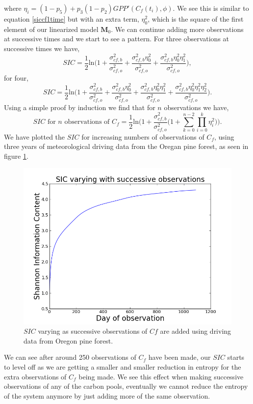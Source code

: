 \documentclass[11pt]{article}
\begin{document}
where $\eta_i=(1-p_5)+p_3(1-p_2)GPP'(C_f(t_i),\phi)$. We see this is similar to equation \ref{siccf1time} but with an extra term, $\eta_0^2$, which is the square of the first element of our linearized model $\mathbf{M}_0$. We can continue adding more observations at successive times and we start to see a pattern. For three observations at successive times we have,
\begin{equation}
SIC =\frac{1}{2}\text{ln} \bigg(1+\frac{\sigma_{cf,b}^{2}}{\sigma_{cf,o}^{2}}+\frac{\sigma_{cf,b}^{2}\eta_0^{2}}{\sigma_{cf,o}^{2}}+\frac{\sigma_{cf,b}^{2}\eta_0^{2}\eta_1^{2}}{\sigma_{cf,o}^{2}} \bigg),
\end{equation}
for four,
\begin{equation}
SIC =\frac{1}{2}\text{ln} \bigg(1+\frac{\sigma_{cf,b}^{2}}{\sigma_{cf,o}^{2}}+\frac{\sigma_{cf,b}^{2}\eta_0^{2}}{\sigma_{cf,o}^{2}}+\frac{\sigma_{cf,b}^{2}\eta_0^{2}\eta_1^{2}}{\sigma_{cf,o}^{2}}+\frac{\sigma_{cf,b}^{2}\eta_0^{2}\eta_1^{2}\eta_2^{2}}{\sigma_{cf,o}^{2}} \bigg).
\end{equation}
Using a simple proof by induction we find that for $n$ observations we have,
\begin{equation}
SIC\text{ for }n\text{ observations of }C_f = \frac{1}{2}\text{ln}\bigg(1+\frac{\sigma_{cf,b}^{2}}{\sigma_{cf,o}^{2}}\big(1+\sum_{k=0}^{n-2}\prod_{i=0}^{k}\eta_i^{2}\big)\bigg).
\end{equation}
We have plotted the $SIC$ for increasing numbers of observations of $C_f$, using three years of meteorological driving data from the Oregan pine forest, as seen in figure \ref{Cf_succ}.

\begin{figure}[H]
\centering
\includegraphics[height=.34\textwidth]{SIC0_1090cf.png}
\caption{$SIC$ varying as successive observations of $Cf$ are added using driving data from Oregon pine forest.}
\label{Cf_succ}
\end{figure}

We can see after around 250 observations of $C_f$ have been made, our $SIC$ starts to level off as we are getting a smaller and smaller reduction in entropy for the extra observations of $C_f$ being made. We see this effect when making successive observations of any of the carbon pools, eventually we cannot reduce the entropy of the system anymore by just adding more of the same observation.  
\end{document}
